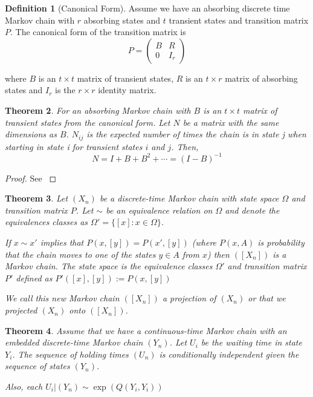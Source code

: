 \documentclass{article}
\theoremstyle{plain}
\newtheorem{theorem}{Theorem}[section]
\theoremstyle{definition}
\newtheorem{defn}[theorem]{Definition}
\theoremstyle{remark}
\numberwithin{equation}{section}
\begin{document}
\begin{defn}[Canonical Form] \cite{grinstead2003}
Assume we have an absorbing discrete time Markov chain with $r$ absorbing states and $t$ transient states and  transition matrix $P$.
The canonical form of the transition matrix is
\begin{equation}
    P = \begin{pmatrix}
        B & R\\
        0 & I_{r}
    \end{pmatrix}
\end{equation}

where $B$ is an $t \times t$ matrix of transient states, $R$ is an $t \times r$ matrix of absorbing states and $I_{r}$ is the $r \times r$ identity matrix.
\end{defn}

\begin{theorem} \label{thm:fund_exp} \cite{grinstead2003}
For an absorbing Markov chain with $B$ is an $t \times t$ matrix of transient states from the canonical form. Let $N$ be a matrix with the same dimensions as $B$. $N_{ij}$ is the expected number of times the chain is in state j when starting in state i for transient states $i$ and $j$. Then,
\begin{equation}
    N = I + B + B^2 + \cdots = (I - B)^{-1}
\end{equation}
\end{theorem}

\begin{proof}
See \cite{grinstead2003}
\end{proof}

\begin{theorem}\label{thm:mc_projection} \cite{LevinPeresWilmer2006}
Let $(X_n)$ be a discrete-time Markov chain with state space $\Omega$ and transition matrix $P$.
Let $\sim$ be an equivalence relation on $\Omega$ and denote the equivalences classes as $\Omega' = \{[x]: x \in \Omega\}$.

If $x \sim x'$ implies that $P(x,[y]) = P(x', [y])$ (where $P(x,A)$ is probability that the chain moves to one of the states $y \in A$ from $x$) then $([X_n])$  is a Markov chain.
The state space is the equivalence classes $\Omega'$ and transition matrix $P'$ defined as $P'([x],[y]) := P(x, [y])$

We call this new Markov chain $([X_n])$ a projection of $(X_n)$ or that we projected $(X_n)$ onto $([X_n])$.
\end{theorem}

\begin{theorem}\label{thm:x_N_indep}
Assume that we have a continuous-time Markov chain with an embedded discrete-time Markov chain $(Y_n)$.
Let $U_i$ be the waiting time in state $Y_i$.
The sequence of holding times $(U_n)$ is conditionally independent given the sequence of states $(Y_n)$.

Also, each $U_i | (Y_n) \sim \exp(Q(Y_i,Y_i))$
\end{theorem}
\end{document}
